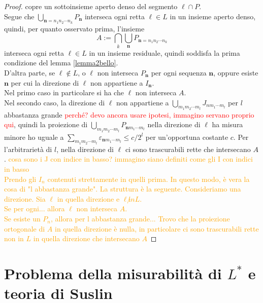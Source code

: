 \documentclass[a4paper, twoside,openright]{article}
\newcommand{\<}{\langle}
\renewcommand{\>}{\rangle}
\begin{document}
\begin{proof}
copre un sottoinsieme aperto denso del segmento $\ell \cap P$.\\
Segue che $\bigcup_{\mathbf{n}=n_{1} n_{2} \cdots n_{k}} P_{\mathbf{n}}$ interseca ogni retta $\ell \in L$ in un insieme aperto denso, quindi, per quanto osservato prima, l'insieme 
$$
A:= \bigcap_{k} \bigcup_{\mathbf{n}} P_{\mathbf{n}=n_{1} n_{2} \cdots n_{k}}
$$
interseca ogni retta $\ell \in L$ in un insieme residuale, quindi soddisfa la prima condizione del lemma \ref{lemma2bello}.\\
D'altra parte, se $\ell \notin L$, o $\ell$ non interseca $P_{\mathbf{n}}$ per ogni sequenza $\mathbf{n}$, oppure esiste $\mathbf{n}$ per cui la direzione di $\ell$ non appartiene a $I_{\mathbf{n}}$.\\
Nel primo caso in particolare si ha che $\ell$ non interseca $A$.\\
Nel secondo caso, la direzione di $\ell$ non appartiene a $\bigcup_{m_{1} m_{2} \cdots m_{l}} J_{n m_{1} \cdots m_{l}}$ per $l$ abbastanza grande \textcolor{red}{perché? devo ancora usare ipotesi, immagino servano proprio qui}, quindi la proiezione di $\bigcup_{m_{1} m_{2} \cdots m_{l}} P_{\mathbf{n} m_{1} \cdots m_{l}}$ nella direzione di $\ell$ ha misura minore ho uguale a $\sum_{m_{1} m_{2} \cdots m_{l}} \varepsilon_{\mathbf{n} m_{1} \cdots m_{l}} \leq c/2^l$ per un'opportuna costante $c$. Per l'arbitrarietà di $l$, nella direzione di $\ell$ ci sono trascurabili rette che intersecano $A$.
\textcolor{orange}{cosa sono i J con indice in basso? immagino siano definiti come gli I con indici in basso\\
Prendo gli $I_n$ contenuti strettamente in quelli prima. In questo modo, è vera la cosa di "l abbastanza grande".
La struttura è la seguente. Consideriamo una direzione. Sia $\ell$ in quella direzione e $\ell \not in L$.\\
Se per ogni... allora $\ell$ non interseca $A$.\\
Se esiste un $P_n$, allora per l abbastanza grande... Trovo che la proiezione ortogonale di $A$ in quella direzione è nulla, in particolare ci sono trascurabili rette non in $L$ in quella direzione che intersecano $A$}
\end{proof}

\newpage

\section{Problema della misurabilità di $L^*$ e teoria di Suslin}
\end{document}
